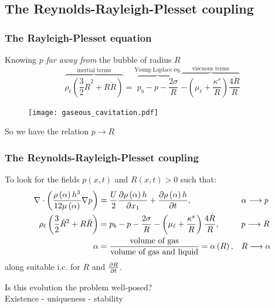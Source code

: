 \documentclass[10pt,aspectratio=169]{beamer}
\begin{document}
\subsection{The Reynolds-Rayleigh-Plesset coupling}

\begin{frame}
\frametitle{The Rayleigh-Plesset equation}
\vspace*{1.0cm}
\hspace*{-0.5cm}
\begin{minipage}{0.4\textwidth}
Knowing $p$ \emph{far away from} the bubble of radius $R$
\begin{equation*}
\overbrace{\rho_\ell\left(\frac{3}{2}\dot{R}^2+R\ddot{R}\right)}^{\text{inertial terms}}=\overbrace{p_b-p-\frac{2\sigma}{R}}^{\text{Young-Laplace eq.}}\overbrace{-\left(\mu_\ell+\frac{\kappa^s}{R}\right)\frac{4\dot{R}}{R}}^{\text{viscuous terms}}
\end{equation*}
\end{minipage}%
\hspace*{0.5cm}
\begin{minipage}{0.5\textwidth}
\begin{figure}[h]
	\texttt{[image: gaseous\_cavitation.pdf]}
\end{figure}
\end{minipage}
\begin{center}
So we have the relation $p\longrightarrow R$
\end{center}

\end{frame}

\begin{frame}
\frametitle{The Reynolds-Rayleigh-Plesset coupling}

To look for the fields $p(x,t)$ and $R(x,t)>0$ such that:
\begin{align*}
\nabla\cdot\left(\frac{\rho\left(\alpha\right) h^3}{12\mu\left(\alpha\right) }\nabla p \right)&=\frac{U}{2}\frac{\partial \rho\left(\alpha\right) h}{\partial x_1}+\frac{\partial \rho\left(\alpha\right) h}{\partial t},&&\alpha \longrightarrow p\\
\rho_\ell\left(\frac{3}{2}\dot{R}^2+R\ddot{R}\right)&=p_b-p-\frac{2\sigma}{R}-\left(\mu_\ell+\frac{\kappa^s}{R}\right)\frac{4\dot{R}}{R},&&p\longrightarrow R\\
\alpha&=\frac{\mbox{volume of gas}}{\mbox{volume of gas and liquid}}=\alpha\left(R\right),&&R\longrightarrow \alpha
\end{align*}
along suitable i.c. for $R$ and $\frac{\partial R}{\partial t}$.
\begin{center}
	Is this evolution the problem well-posed?\\
	Existence - uniqueness - stability
\end{center}
\end{frame} 
\end{document}
